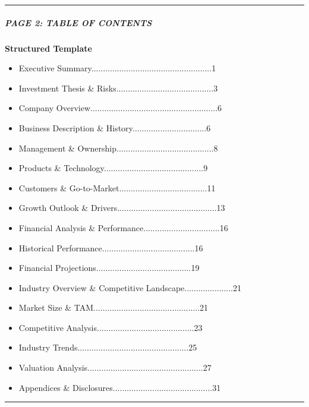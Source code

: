 \documentclass[11pt]{article}
\begin{document}
\vspace{0.5em}\hrule\vspace{0.5em}

\subparagraph{PAGE 2: TABLE OF CONTENTS}\mbox{}\par

\textbf{Structured Template}
\begin{itemize}[leftmargin=*,itemsep=2pt,topsep=2pt]
\item {} Executive Summary....................................................1
\item {} Investment Thesis \& Risks..........................................3
\item {} Company Overview.......................................................6
\item {} Business Description \& History................................6
\item {} Management \& Ownership..........................................8
\item {} Products \& Technology...........................................9
\item {} Customers \& Go-to-Market......................................11
\item {} Growth Outlook \& Drivers...........................................13
\item {} Financial Analysis \& Performance.................................16
\item {} Historical Performance........................................16
\item {} Financial Projections.........................................19
\item {} Industry Overview \& Competitive Landscape.....................21
\item {} Market Size \& TAM..............................................21
\item {} Competitive Analysis..........................................23
\item {} Industry Trends................................................25
\item {} Valuation Analysis..................................................27
\item {} Appendices \& Disclosures...........................................31
\end{itemize}

\vspace{0.5em}\hrule\vspace{0.5em}
\end{document}
